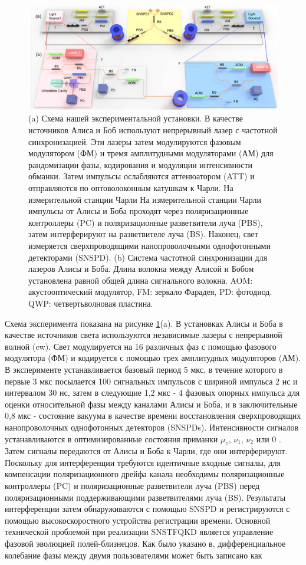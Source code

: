 \begin{figure}
    \centering
    \includegraphics[width=\linewidth]{images/TF experiment scheme.jpg}
    \caption{(a) Схема нашей экспериментальной установки. В качестве источников Алиса и Боб используют непрерывный лазер с частотной синхронизацией.  Эти лазеры затем модулируются фазовым модулятором (ФМ) и тремя амплитудными модуляторами (АМ) для рандомизации фазы, кодирования и модуляции интенсивности обманки. Затем импульсы ослабляются аттенюатором (ATT) и отправляются по оптоволоконным катушкам к Чарли. На измерительной станции Чарли На измерительной станции Чарли импульсы от Алисы и Боба проходят через поляризационные контроллеры (PC) и поляризационные разветвители луча (PBS), затем интерферируют на разветвителе луча (BS). Наконец, свет измеряется сверхпроводящими нанопроволочными однофотонными детекторами (SNSPD). (b) Система частотной синхронизации для лазеров Алисы и Боба. Длина волокна между Алисой и Бобом установлена равной общей длина сигнального волокна. AOM: акустооптический модулятор, FM: зеркало Фарадея, PD: фотодиод. QWP: четвертьволновая пластина.}
    \label{fig:TF experiment scheme}
\end{figure}
Схема эксперимента показана на рисунке \ref{fig:TF experiment scheme}(a). В установках Алисы и Боба в качестве источников света используются независимые лазеры с непрерывной волной (cw). Свет модулируется на 16 различных фаз с помощью фазового модулятора (ФМ) и кодируется с помощью трех амплитудных модуляторов (АМ). В эксперименте устанавливается базовый период 5 мкс, в течение которого в первые 3 мкс посылается 100 сигнальных импульсов с шириной импульса 2 нс и интервалом 30 нс, затем в следующие 1,2 мкс - 4 фазовых опорных импульса для оценки относительной фазы между каналами Алисы и Боба, и в заключительные 0,8 мкс - состояние вакуума в качестве времени восстановления сверхпроводящих нанопроволочных однофотонных детекторов (SNSPDs). Интенсивности сигналов устанавливаются в оптимизированные состояния приманки $\mu_z$, $\nu_1$, $\nu_2$ или 0 . Затем сигналы передаются от Алисы и Боба к Чарли, где они интерферируют. Поскольку для интерференции требуются идентичные входные сигналы, для компенсации поляризационного дрейфа канала необходимы поляризационные контроллеры (PC) и поляризационные разветвители луча (PBS) перед поляризационными поддерживающими разветвителями луча (BS). Результаты интерференции затем обнаруживаются с помощью SNSPD и регистрируются с помощью высокоскоростного устройства регистрации времени. Основной технической проблемой при реализации SNSTFQKD является управление фазовой эволюцией полей-близнецов. Как было указано в, дифференциальное колебание фазы между двумя пользователями может быть записано как
